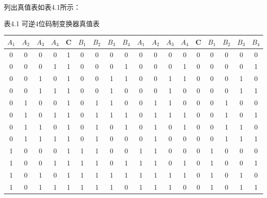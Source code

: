 \documentclass{ctexart}
\begin{document}
    列出真值表如表4.1所示：
    \begin{table}[!ht]
\centering 表4.1 可逆4位码制变换器真值表
\begin{tabular}{|cccc|c|cccc||cccc|c|cccc|}
\hline
$A_1$ & $A_2$ & $A_3$ & $A_4$ & C & $B_1$ & $B_2$ & $B_3$ & $B_4$ & $A_1$ & $A_2$ & $A_3$ & $A_4$ & C & $B_1$ & $B_2$ & $B_3$ & $B_4$ \\ \hline
0     & 0     & 0     & 0     & 1 & 0     & 0     & 0     & 0     & 0     & 0     & 0     & 0     & 0 & 0     & 0     & 0     & 0     \\ \hline
0     & 0     & 0     & 1     & 1 & 0     & 0     & 0     & 1     & 0     & 0     & 0     & 1     & 0 & 0     & 0     & 0     & 1     \\ \hline
0     & 0     & 1     & 0     & 1 & 0     & 0     & 1     & 1     & 0     & 0     & 1     & 1     & 0 & 0     & 0     & 1     & 0     \\ \hline
0     & 0     & 1     & 1     & 1 & 0     & 0     & 1     & 0     & 0     & 0     & 1     & 0     & 0 & 0     & 0     & 1     & 1     \\ \hline
0     & 1     & 0     & 0     & 1 & 0     & 1     & 1     & 0     & 0     & 1     & 1     & 0     & 0 & 0     & 1     & 0     & 0     \\ \hline
0     & 1     & 0     & 1     & 1 & 0     & 1     & 1     & 1     & 0     & 1     & 1     & 1     & 0 & 0     & 1     & 0     & 1     \\ \hline
0     & 1     & 1     & 0     & 1 & 0     & 1     & 0     & 1     & 0     & 1     & 0     & 1     & 0 & 0     & 1     & 1     & 0     \\ \hline
0     & 1     & 1     & 1     & 1 & 0     & 1     & 0     & 0     & 0     & 1     & 0     & 0     & 0 & 0     & 1     & 1     & 1     \\ \hline
1     & 0     & 0     & 0     & 1 & 1     & 1     & 0     & 0     & 1     & 1     & 0     & 0     & 0 & 1     & 0     & 0     & 0     \\ \hline
1     & 0     & 0     & 1     & 1 & 1     & 1     & 0     & 1     & 1     & 1     & 0     & 1     & 0 & 1     & 0     & 0     & 1     \\ \hline
1     & 0     & 1     & 0     & 1 & 1     & 1     & 1     & 1     & 1     & 1     & 1     & 1     & 0 & 1     & 0     & 1     & 0     \\ \hline
1     & 0     & 1     & 1     & 1 & 1     & 1     & 1     & 0     & 1     & 1     & 1     & 0     & 0 & 1     & 0     & 1     & 1     \\ \hline

\end{tabular}
\end{table}
\end{document}
